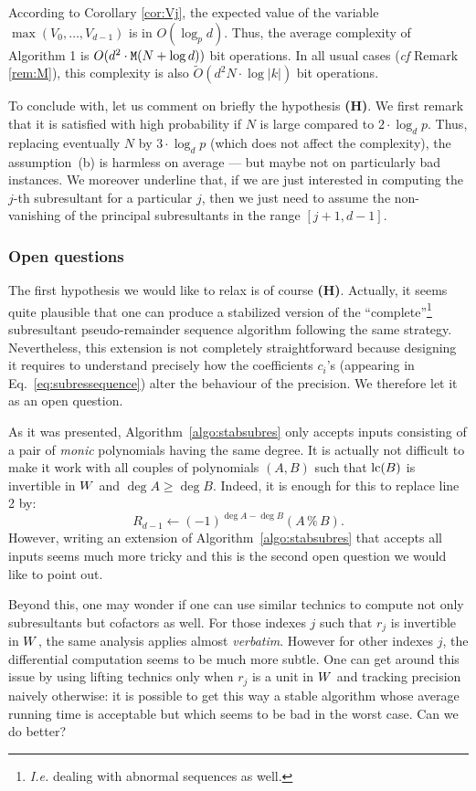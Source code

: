 \documentclass{article}
\begin{document}
According to Corollary \ref{cor:Vj}, the expected value of the variable 
$\max(V_0, \ldots, V_{d-1})$ is in $O(\log_p d)$. Thus, the average 
complexity of Algorithm 1 is $O(d^2 \cdot \text{\tt M}(N + \log d))$ bit 
operations. In all usual cases (\emph{cf} Remark \ref{rem:M}), this
complexity is also $\tilde O(d^2 N \cdot \log |k|)$ bit operations.

To conclude with, let us comment on briefly the hypothesis {\bf (H)}. We 
first remark that it is satisfied with high probability if $N$ is large 
compared to $2 \cdot \log_d p$. Thus, replacing eventually $N$ by $3 
\cdot \log_d p$ (which does not affect the complexity), the 
assumption~(b) is harmless on average --- but maybe not on particularly 
bad instances. We moreover underline that, if we are just interested in 
computing the $j$-th subresultant for a particular $j$, then we just 
need to assume the non-vanishing of the principal subresultants in the 
range $[j+1, d-1]$.

\subsubsection*{Open questions}
\label{subsec:questions}

The first hypothesis we would like to relax is of course {\bf (H)}. 
Actually, it seems quite plausible that one can produce a stabilized 
version of the ``complete''\footnote{\emph{I.e.} dealing with abnormal 
sequences as well.} subresultant pseudo-remainder sequence algorithm 
following the same strategy. Nevertheless, this extension is not 
completely straightforward because designing it requires to understand 
precisely how the coefficients $c_i$'s (appearing in 
Eq.~\ref{eq:subressequence}) alter the behaviour of the precision. We
therefore let it as an open question.

As it was presented, Algorithm~\ref{algo:stabsubres} only accepts inputs 
consisting of a pair of \emph{monic} polynomials having the same degree. 
It is actually not difficult to make it work with all couples of 
polynomials $(A,B)$ such that $\text{\rm lc}(B)$ is invertible in $W$ and $\deg A 
\geq \deg B$. Indeed, it is enough for this to replace line 2 by:
$$R_{d-1} \leftarrow (-1)^{\deg A - \deg B} (A \,\%\, B).$$
However, writing an extension of Algorithm~\ref{algo:stabsubres} that 
accepts all inputs seems much more tricky and this is the second open
question we would like to point out.

Beyond this, one may wonder if one can use similar technics to compute 
not only subresultants but cofactors as well. For those indexes $j$ such 
that $r_j$ is invertible in $W$, the same analysis applies almost 
\emph{verbatim}. However for other indexes $j$, the differential 
computation seems to be much more subtle. One can get around this issue 
by using lifting technics only when $r_j$ is a unit in $W$ and tracking 
precision naively otherwise: it is possible to get this way a stable 
algorithm whose average running time is acceptable but which seems to be 
bad in the worst case. Can we do better?
\end{document}
